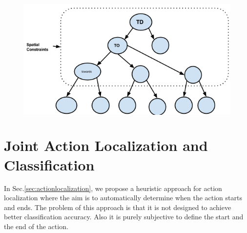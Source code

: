 \documentclass[10pt,twocolumn,letterpaper]{article}
\newcommand{\argmax}{\operatornamewithlimits{argmax}}
\begin{document}
\begin{figure}[ht]
\centering

  \includegraphics[scale = 0.3]{dec_tree.png}%
  \label{Fig:tree}%

\end{figure}




\section{Joint Action Localization and Classification}
In Sec.\ref{sec:actionlocalization}, we propose a heuristic approach for action localization where the aim is to automatically determine when the action starts and ends. The problem of this approach is that it is not designed to achieve better classification accuracy. Also it is purely subjective to define the start and the end of the action.
\end{document}
